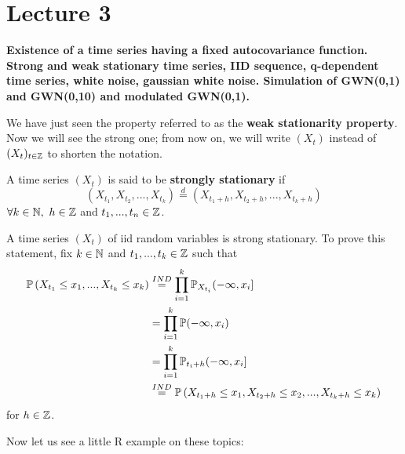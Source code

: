 \section{Lecture 3}
\label{lecture3}

\begin{center}
    \textbf{Existence of a time series having a fixed autocovariance function. Strong and weak stationary time series, IID sequence, q-dependent time series, white noise, gaussian white noise. Simulation of GWN(0,1) and GWN(0,10) and modulated GWN(0,1).}
\end{center}

We have just seen the property referred to as the \textbf{weak stationarity property}. Now we will see the strong one; from now on, we will write $(X_t)$ instead of $(X_t)_{t\in\mathbb{Z}}$ to shorten the notation.

\begin{definition}
    A time series $(X_t)$ is said to be \textbf{strongly stationary} if
    \[
        \left(X_{t_1}, X_{t_2},...,X_{t_k}\right)\stackrel{d}{=}\left(X_{t_1+h}, X_{t_2+h},...,X_{t_k+h}\right)
    \]
    $\forall k\in\mathbb{N},\ h\in\mathbb{Z}$ and $t_1,...,t_n\in\mathbb{Z}$.
\end{definition}

\begin{example}
    A time series $(X_t)$ of iid random variables is strong stationary. To prove this statement, fix $k\in\mathbb{N}$ and $t_1,...,t_k\in\mathbb{Z}$ such that
    \begin{equation*}
        \begin{split}
            \mathbb{P}\left(X_{t_1}\le x_1,...,X_{t_k}\le x_k\right)&\stackrel{IND}{=}\prod_{i=1}^{k}\mathbb{P}_{X_{t_i}}(-\infty,x_i]\\
            &=\prod_{i=1}^{k}\mathbb{P}(-\infty,x_i)\\
            &=\prod_{i=1}^k\mathbb{P}_{t_i+h}(-\infty,x_i]\\
            &\stackrel{IND}{=}\mathbb{P}\left(X_{t_1+h}\le x_1, X_{t_2+h}\le x_2,...,X_{t_k+h}\le x_k\right)
        \end{split}
    \end{equation*}
    for $h\in\mathbb{Z}$.
\end{example}

Now let us see a little R example on these topics:

